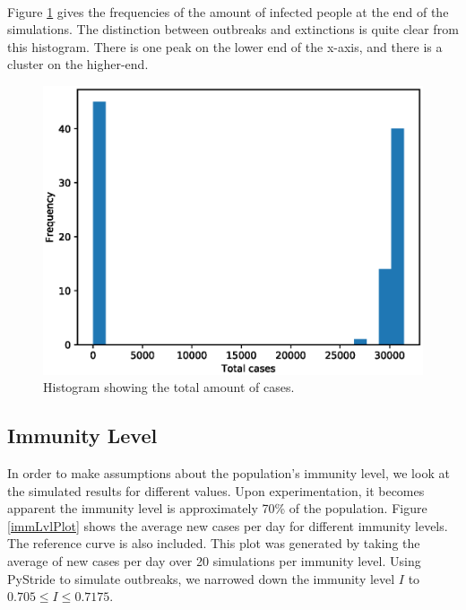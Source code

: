 \documentclass[runningheads]{llncs}
\begin{document}
\paragraph{}
Figure \ref{ETHist} gives the frequencies of the amount of infected people at the end of the simulations. The distinction between outbreaks and extinctions is quite clear from this histogram. There is one peak on the lower end of the x-axis, and there is a cluster on the higher-end.

\begin{figure}[!h]
	\includegraphics[width=\textwidth]{Hist.eps}
	\caption{Histogram showing the total amount of cases.} 
	\label{ETHist}
\end{figure}

\subsection{Immunity Level}
In order to make assumptions about the population's immunity level, we look at the simulated results for different values. Upon experimentation, it becomes apparent the immunity level is approximately 70\% of the population. Figure \ref{immLvlPlot} shows the average new cases per day for different immunity levels. The reference curve is also included. This plot was generated by taking the average of new cases per day over 20 simulations per immunity level. Using PyStride to simulate outbreaks, we narrowed down the immunity level $I$ to \( 0.705 \leq I \leq 0.7175 \).
\end{document}
